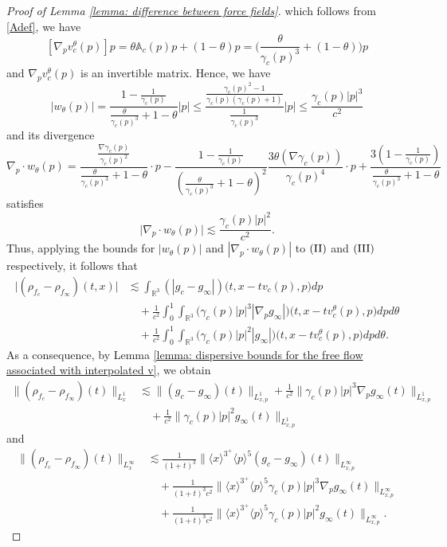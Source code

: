 \documentclass[reqno, 11pt, letterpaper]{amsart}
\theoremstyle{remark}
\numberwithin{equation}{section}
\numberwithin{theorem}{section}
\numberwithin{table}{section}
\numberwithin{figure}{section}
\begin{document}
\begin{proof}[Proof of Lemma \ref{lemma: difference between force fields}]
which follows from \eqref{Adef}, we have
$$[\nabla_p v_c^\theta(p)]p=\theta \mathbb{A}_c(p)p+(1-\theta)p=\bigg(\frac{\theta}{\gamma_c(p)^3}+(1-\theta)\bigg)p$$
and $\nabla_p v_c^\theta(p)$ is an invertible matrix. Hence, we have 
$$|w_\theta(p)|=\frac{1-\frac{1}{\gamma_c(p)}}{\frac{\theta}{\gamma_c(p)^3}+1-\theta}|p|\leq\frac{\frac{\gamma_c(p)^2-1}{\gamma_c(p)(\gamma_c(p)+1)}}{\frac{1}{\gamma_c(p)^3}}|p|\leq\frac{\gamma_c(p)|p|^3}{c^2}$$
and its divergence 
$$\nabla_p\cdot w_\theta(p)=\frac{\frac{\nabla\gamma_c(p)}{\gamma_c(p)^2}}{\frac{\theta}{\gamma_c(p)^3}+1-\theta}\cdot p-\frac{1-\frac{1}{\gamma_c(p)}}{(\frac{\theta}{\gamma_c(p)^3}+1-\theta)^2}\frac{3\theta(\nabla\gamma_c(p))}{\gamma_c(p)^4}\cdot p+\frac{3(1-\frac{1}{\gamma_c(p)})}{\frac{\theta}{\gamma_c(p)^3}+1-\theta}$$
satisfies
$$\big|\nabla_p\cdot w_\theta(p)\big|\lesssim\frac{\gamma_c(p)|p|^2}{c^2}.$$
Thus, applying the bounds for $|w_\theta(p)|$ and $|\nabla_p\cdot w_\theta(p)|$ to $\textup{(II)}$ and $\textup{(III)}$ respectively, it follows that 
$$\begin{aligned}
\big|(\rho_{f_c}-\rho_{f_\infty})(t,x)\big|&\lesssim\int_{\mathbb{R}^3}(|g_c-g_\infty|)\Big(t,x-tv_c(p),p\Big)dp\\
&\quad+\frac{1}{c^2}\int_0^1\int_{\mathbb{R}^3}\Big(\gamma_c(p)|p|^3|\nabla_pg_\infty|\Big)\Big(t,x-tv_c^\theta(p),p\Big)dpd\theta\\
&\quad+\frac{1}{c^2}\int_0^1\int_{\mathbb{R}^3}\Big(\gamma_c(p)|p|^2|g_\infty|\Big)\Big(t,x-tv_c^\theta(p),p\Big)dpd\theta.
\end{aligned}$$
As a consequence, by Lemma \ref{lemma: dispersive bounds for the free flow associated with interpolated v}, we obtain 
$$\begin{aligned}
\big\|(\rho_{f_c}-\rho_{f_\infty})(t)\big\|_{L_x^1}&\lesssim\|(g_c-g_\infty)(t)\|_{L_{x,p}^1}+\frac{1}{c^2}\big\|\gamma_c(p)|p|^3\nabla_pg_\infty(t)\big\|_{L_{x,p}^1}\\
&\quad+\frac{1}{c^2}\big\|\gamma_c(p)|p|^2g_\infty(t)\big\|_{L_{x,p}^1}
\end{aligned}$$
and
$$\begin{aligned}
\big\|(\rho_{f_c}-\rho_{f_\infty})(t)\big\|_{L_x^\infty}&\lesssim\frac{1}{(1+t)^3}\Big\|\langle x\rangle^{3^+}\langle p\rangle^{5}(g_c-g_\infty)(t)\Big\|_{L^\infty_{x,p}}\\
&\quad+\frac{1}{(1+t)^3c^2}\Big\|\langle x\rangle^{3^+}\langle p\rangle^{5}\gamma_c(p)|p|^3\nabla_pg_\infty(t)\Big\|_{L^\infty_{x,p}}\\
&\quad+\frac{1}{(1+t)^3c^2}\Big\|\langle x\rangle^{3^+}\langle p\rangle^{5}\gamma_c(p)|p|^2g_\infty(t)\Big\|_{L^\infty_{x,p}}.

\end{aligned}$$
\end{proof}
\end{document}
